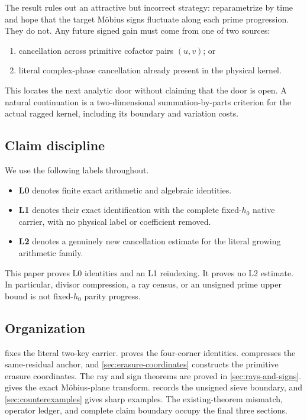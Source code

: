 The result rules out an attractive but incorrect strategy: reparametrize
by time and hope that the target M\"obius signs fluctuate along each
prime progression.  They do not.  Any future signed gain must come from
one of two sources:
\begin{enumerate}[label=\textup{(\roman*)},leftmargin=3em]
 \item cancellation across primitive cofactor pairs \((u,v)\); or
 \item literal complex-phase cancellation already present in the physical
       kernel.
\end{enumerate}
This locates the next analytic door without claiming that the door is
open.  A natural continuation is a two-dimensional summation-by-parts
criterion for the actual ragged kernel, including its boundary and
variation costs.

\subsection{Claim discipline}

We use the following labels throughout.
\begin{itemize}
 \item \textbf{L0} denotes finite exact arithmetic and algebraic
       identities.
 \item \textbf{L1} denotes their exact identification with the complete
       fixed-\(h_0\) native carrier, with no physical label or coefficient
       removed.
 \item \textbf{L2} denotes a genuinely new cancellation estimate for the
       literal growing arithmetic family.
\end{itemize}
This paper proves L0 identities and an L1 reindexing.  It proves no L2
estimate.  In particular, divisor compression, a ray census, or an
unsigned prime upper bound is not fixed-\(h_0\) parity progress.

\subsection{Organization}

 fixes the literal two-key carrier.
 proves the four-corner identities.
 compresses the same-residual anchor, and
\cref{sec:erasure-coordinates} constructs the primitive erasure
coordinates.  The ray and sign theorems are proved in
\cref{sec:rays-and-signs}.   gives the exact
M\"obius-plane transform.   records the unsigned
sieve boundary, and \cref{sec:counterexamples} gives sharp examples.
The existing-theorem mismatch, operator ledger, and complete claim
boundary occupy the final three sections.
